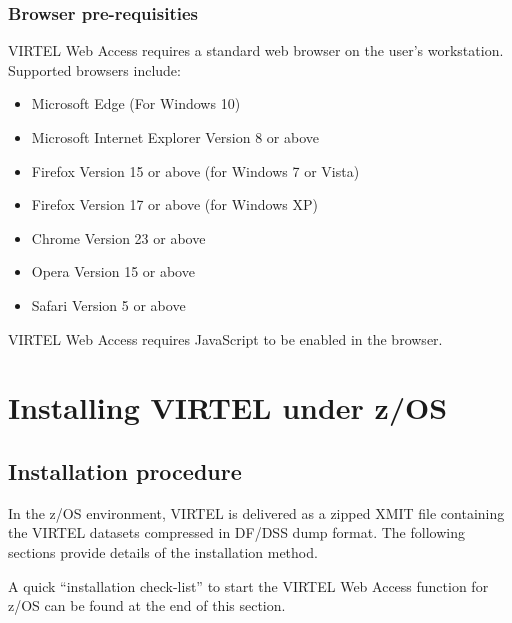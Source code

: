 \documentclass[letterpaper,10pt,english]{sphinxmanual}
\begin{document}
\subsection{Browser pre-requisities}
\label{\detokenize{Installation_Guide:index-2}}\label{\detokenize{Installation_Guide:browser-pre-requisities}}
VIRTEL Web Access requires a standard web browser on the user’s workstation. Supported browsers include:
\begin{itemize}
\item {} 
Microsoft Edge (For Windows 10)

\item {} 
Microsoft Internet Explorer Version 8 or above

\item {} 
Firefox Version 15 or above (for Windows 7 or Vista)

\item {} 
Firefox Version 17 or above (for Windows XP)

\item {} 
Chrome Version 23 or above

\item {} 
Opera Version 15 or above

\item {} 
Safari Version 5 or above

\end{itemize}

VIRTEL Web Access requires JavaScript to be enabled in the browser.
\label{\detokenize{Installation_Guide:vvrrig-installz-os}}

\chapter{Installing VIRTEL under z/OS}
\label{\detokenize{Installation_Guide:installing-virtel-under-z-os}}\label{\detokenize{Installation_Guide:index-3}}

\section{Installation procedure}
\label{\detokenize{Installation_Guide:installation-procedure}}
In the z/OS environment, VIRTEL is delivered as a zipped XMIT file containing the VIRTEL datasets compressed in DF/DSS dump format. The following sections provide details of the installation method.

A quick “installation check-list” to start the VIRTEL Web Access function for z/OS can be found at the end of this section.
\end{document}
